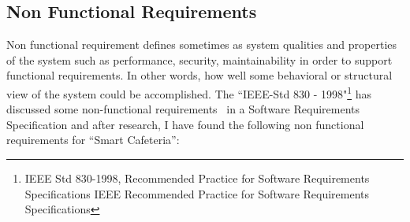 \subsection{Non Functional Requirements}
\label{subsec:NFR}
Non functional requirement defines sometimes as system qualities and properties
of the system such as performance, security, maintainability in order to support
functional requirements. In other words, how well some behavioral or structural
view of the system could be accomplished.
The ``IEEE-Std 830 - 1998"\footnote{ IEEE Std 830-1998, Recommended Practice for
Software Requirements Specifications IEEE Recommended Practice for Software
Requirements Specifications} has discussed some non-functional
requirements~\cite{Committee1998} in a Software Requirements Specification and
after research, I have found the following non functional requirements for
``Smart Cafeteria'':

\renewcommand{\labelenumi}{\arabic{enumi}.}
\renewcommand{\labelenumii}{(\roman{enumii})}


